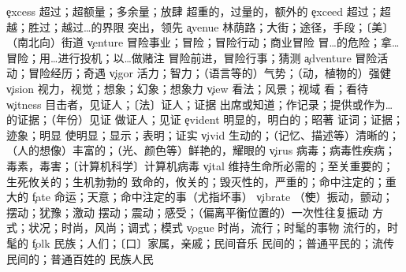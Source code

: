\begin{multicols}{2}
\c{excess}  \n 超过；超额量；多余量；放肆  \a 超重的，过量的，额外的
\c{exceed}  \vt 超过；超越；胜过；越过…的界限 \vi 突出，领先
\c{avenue}  \n 林荫路；大街；途径，手段；〔美〕（南北向）街道
\c{venture}  \n 冒险事业；冒险；冒险行动；商业冒险 \vt 冒…的危险；拿…冒险；用…进行投机；以…做赌注 \vi 冒险前进，冒险行事；猜测 
\c{adventure}  \n 冒险活动；冒险经历；奇遇
\c{vigor}  \n 活力；智力；（语言等的）气势；（动，植物的）强健
\c{vision}  \n 视力，视觉；想象；幻象；想象力
\c{view}  \n 看法；风景；视域 \vt 看；看待
\c{witness}  \n 目击者，见证人；〔法〕证人；证据 \vt 出席或知道；作记录；提供或作为…的证据；（年份）见证 \vi 做证人；见证
\c{evident}  \a 明显的，明白的；昭著
  \n 证词；证据；迹象；明显 \vt 使明显；显示；表明；证实
\c{vivid}  \a 生动的；（记忆、描述等）清晰的；（人的想像）丰富的；（光、颜色等）鲜艳的，耀眼的
\c{virus}  \n 病毒；病毒性疾病；毒素，毒害；〔计算机科学〕计算机病毒
\c{vital}  \a 维持生命所必需的；至关重要的；生死攸关的；生机勃勃的
  \a 致命的，攸关的；毁灭性的，严重的；命中注定的；重大的
\c{fate}  \n 命运；天意；命中注定的事（尤指坏事）
\c{vibrate}  \v （使）振动，颤动；摆动；犹豫；激动
  \n 摆动；震动；感受；（偏离平衡位置的）一次性往复振动
  \n 方式；状况；时尚，风尚；调式；模式
\c{vogue}  \n 时尚，流行；时髦的事物 \a 流行的，时髦的
\c{folk}  \n 民族；人们；〔口〕家属，亲戚；民间音乐 \a 民间的；普通平民的；流传民间的；普通百姓的 
  \n 民族人民


\end{multicols}
